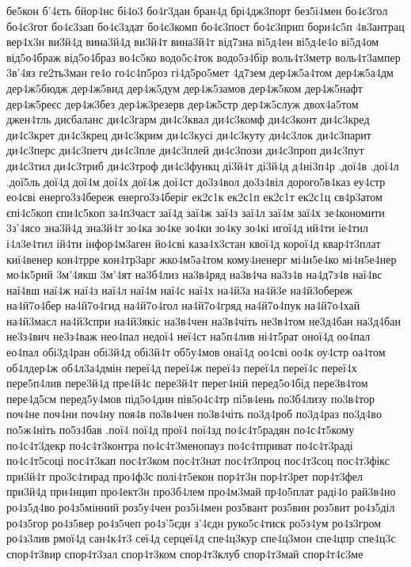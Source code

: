 {бе5кон
б'4єть
бйор4нс
бі4о3
бо4г3дан
бран4д
брі4дж3порт
без5і4мен
бо4є3гол
бо4є3гот
бо4є3зап
бо4є3здат
бо4є3комп
бо4є3пост
бо4є3прип
бори4с5п
4в3антрац
вер4х3н
ви3й4д
вина3й4д
ви3й4т
вина3й4т
від7зна
ві5д4ен
ві5д4е4о
ві5д4ом
від5о4браж
від5о4браз
во4с5ко
водо5с4ток
водо5з4бір
воль4т3метр
воль4т3ампер
3в'4яз
ге2ть3ман
ге4о
го4с4п5роз
гі4д5ро5мет
4д7зем
дер4ж5а4том
дер4ж5а4дм
дер4ж5бюдж
дер4ж5вид
дер4ж5дум
дер4ж5замов
дер4ж5ком
дер4ж5нафт
дер4ж5реєс
дер4ж3без
дер4ж3резерв
дер4ж5стр
дер4ж5служ
двох4а5том
джен4тль
дисбаланс
ди4с3гарм
ди4с3квал
ди4с3комф
ди4с3конт
ди4с3кред
ди4с3крет
ди4с3крец
ди4с3крим
ди4с3кусі
ди4с3куту
ди4с3лок
ди4с3парит
ди4с3перс
ди4с3петч
ди4с3пле
ди4с3плей
ди4с3пози
ди4с3проп
ди4с3пут
ди4с3тил
ди4с3триб
ди4с3троф
ди4с3функц
ді3й4т
ді3й4д
д4ні3п4р
.дої4в
.дої4л
.дої5ль
дої4д
дої4м
дої4х
дої4ж
дої4ст
до3з4вол
до3з4віл
дорого5в4каз
еу4стр
ео4сві
енерго3з4береж
енерго3з4беріг
ек2с1к
ек2с1п
ек2с1т
ек2с1ц
єв4р3атом
єпі4с5коп
єпи4с5коп
за4п3част
заї4д
заї4ж
заї4з
заї4л
заї4м
заї4х
зе4кономити
3з'4ясо
зна3й4д
зна3й4т
зо4ка
зо4ке
зо4ки
зо4ку
зо4кі
игої4д
ий4ти
іе4тил
і4л3е4тил
ій4ти
інфор4м3аген
йо4сві
каза4х3стан
квої4д
корої4д
квар4т3плат
киї4венер
кон4трре
кон4тр3арг
жко4м5а4том
кому4ненерг
мі4н5е4ко
мі4н5е4нер
мо4к5рий
3м'4якш
3м'4ят
на3б4лиз
на3в4ряд
на3в4ча
на3з4в
на4д7з4в
наї4вс
наї4вш
наї4ж
наї4з
наї4л
наї4м
наї4с
наї4х
на4й3а
на4й3е
на4й3обереж
на4й7о4бер
на4й7о4гид
на4й7о4гол
на4й7о4гряд
на4й7о4пук
на4й7о4хай
на4й3масл
на4й3спри
на4й3якіс
на3в4чен
на3в4чіть
не3в4том
не3д4бан
на3д4бан
не3з4вич
не3з4важ
нео4пал
недої4
неї4ст
на5п4лив
ні4т5рат
оної4д
оо4пал
ео4пал
обі3д4ран
обі3й4д
обі3й4т
об5у4мов
онаї4д
оо4сві
оо4к
оу4стр 
оа4том
об4лдер4ж
об4л3а4дмін
переї4д
переї4ж
переї4з
переї4л
переї4с
переї4х
пере5п4лив
пере3й4д
пре4й4с
пере3й4т
перег4ній
перед5о4бід
пере3в4том
пере4д5см
перед5у4мов
під5о4дин
пів5о4с4тр
пі5в4ень
по3б4лизу
по3в4тор
поч4не
поч4ни
поч4ну
поя4в
по3в4чен
по3в4чіть
по3д4роб
по3д4раз
по3д4во
по5ж4ніть
по5з4бав
.пої4
пої4д
прої4
пої4зд
по4с4т5радян
по4с4т5кому
по4с4т3декр
по4с4т3контра
по4с4т3менопауз
по4с4тприват
по4с4т3раді
по4с4т5соці
пос4т3кап
пос4т3ком
пос4т3нат
пос4т3проц
пос4т3соц
пос4т3фікс
при3й4т
про3с4тирад
про4ф3с
полі4т5екон
пор4т3н
пор4т3рет
пор4т3фел
при3й4д
при4нцип
про4ект3н
про3б4лем
про4м3май
пр4о5плат
раді4о
рай3в4но
ро4з5д4во
ро4з5мінний
роз5у4чен
роз5і4мен
роз5вант
роз5вин
роз5вит
ро4з5діл
ро4з5гор
ро4з5вер
ро4з5чеп
ро4з'5єдн
з'4єдн
руко5с4тиск
ро5з4ум
ро4з3гром
ро4з3лив
рмої4д
сан4к4т3
сеї4д
серцеї4д
спе4ц3кур
спе4ц3мон
спе4цпр
спе4ц3с
спор4т3вир
спор4т3зал
спор4т3ком
спор4т3клуб
спор4т3май
спор4т4с3ме
}
